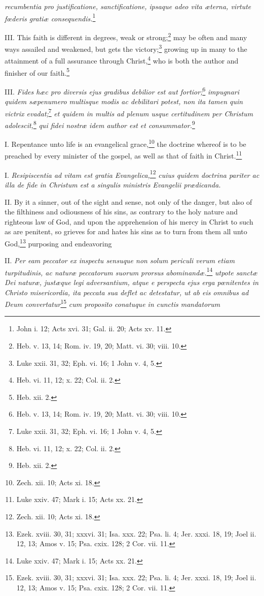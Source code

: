 \emph{recumbentia pro justificatione, sanctificatione, ipsaque adeo vita æterna, virtute fœderis gratiæ consequendis.}\footnote{John i. 12; Acts xvi. 31; Gal. ii. 20; Acts xv. 11.}

III. This faith is different in degrees, weak or strong;\footnote{Heb. v. 13, 14; Rom. iv. 19, 20; Matt. vi. 30; viii. 10.} may be often and many ways assailed and weakened, but gets the victory;\footnote{Luke xxii. 31, 32; Eph. vi. 16; 1 John v. 4, 5.} growing up in many to the attainment of a full assurance through Christ,\footnote{Heb. vi. 11, 12; x. 22; Col. ii. 2.} who is both the author and finisher of our faith.\footnote{Heb. xii. 2.}

III. \emph{Fides hæc pro diversis ejus gradibus debilior est aut fortior;}\footnote{Heb. v. 13, 14; Rom. iv. 19, 20; Matt. vi. 30; viii. 10.}\emph{ impugnari quidem sæpenumero multisque modis ac debilitari potest, non ita tamen quin victrix evadat;}\footnote{Luke xxii. 31, 32; Eph. vi. 16; 1 John v. 4, 5.}\emph{ et quidem in multis ad plenum usque certitudinem per Christum adolescit,}\footnote{Heb. vi. 11, 12; x. 22; Col. ii. 2.}\emph{ qui fidei nostræ idem author est et consummator.}\footnote{Heb. xii. 2.}


I. Repentance unto life is an evangelical grace,\footnote{Zech. xii. 10; Acts xi. 18.} the doctrine whereof is to be preached by every minister of the gospel, as well as that of faith in Christ.\footnote{Luke xxiv. 47; Mark i. 15; Acts xx. 21.}

I. \emph{Resipiscentia ad vitam est gratia Evangelica,}\footnote{Zech. xii. 10; Acts xi. 18.}\emph{ cuius quidem doctrina pariter ac illa de fide in Christum est a singulis ministris Evangelii prædicanda.}

II. By it a sinner, out of the sight and sense, not only of the danger, but also of the filthiness and odiousness of his sins, as contrary to the holy nature and righteous law of God, and upon the apprehension of his mercy in Christ to such as are penitent, so grieves for and hates his sins as to turn from them all unto God,\footnote{Ezek. xviii. 30, 31; xxxvi. 31; Isa. xxx. 22; Psa. li. 4; Jer. xxxi. 18, 19; Joel ii. 12, 13; Amos v. 15; Psa. cxix. 128; 2 Cor. vii. 11.} purposing and endeavoring

II. \emph{Per eam peccator ex inspectu sensuque non solum periculi verum etiam turpitudinis, ac naturæ peccatorum suorum prorsus abominandæ.}\footnote{Luke xxiv. 47; Mark i. 15; Acts xx. 21.}\emph{ utpote sanctæ Dei naturæ, justæque legi adversantium, atque e perspecta ejus erga pœnitentes in Christo misericordia, ita peccata sua deflet ac detestatur, ut ab eis omnibus ad Deum convertatur}\footnote{Ezek. xviii. 30, 31; xxxvi. 31; Isa. xxx. 22; Psa. li. 4; Jer. xxxi. 18, 19; Joel ii. 12, 13; Amos v. 15; Psa. cxix. 128; 2 Cor. vii. 11.}\emph{ cum proposito conatuque in cunctis mandatorum }

